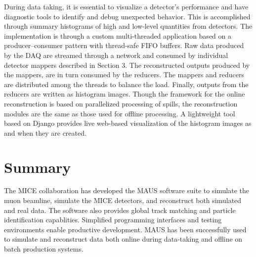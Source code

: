 \documentclass[11pt]{article}
\begin{document}

During data taking, it is essential to visualize a detector's performance and have diagnostic tools to identify and debug unexpected behavior. This is accomplished through summary histograms of  high and low-level quantities from detectors. The implementation is through a custom multi-threaded application based on a producer--consumer pattern with thread-safe FIFO buffers. Raw data produced by the DAQ are streamed through a network and consumed by individual detector mappers described in Section 3. The reconstructed outputs produced by the mappers,  are in turn consumed by the reducers. The mappers and reducers are distributed among the threads to balance the load. Finally,  outputs from the reducers are written as histogram images. Though the framework for the online reconstruction is based on parallelized processing of spills, the reconstruction modules are the same as those used for offline processing. A lightweight tool based on Django \cite{Django} provides live web-based visualization of the histogram images as and when they are created.




\section{Summary}

The MICE collaboration has developed the MAUS software suite to simulate the muon beamline, simulate the MICE detectors, and reconstruct both simulated and real data. The software also provides global track matching and particle identification capablities. Simplified programming interfaces and testing environments enable productive development. MAUS has been successfully used to simulate and reconstruct data both online during data-taking and offline on batch production systems. 
\end{document}
